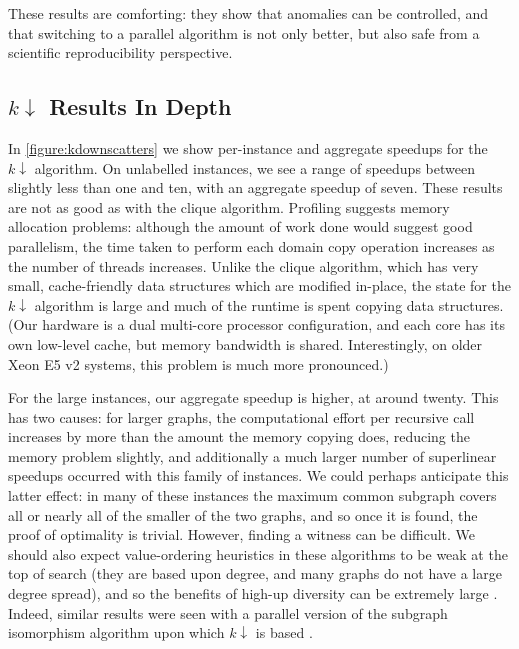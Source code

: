\documentclass{llncs}
\begin{document}
These results are comforting: they show that anomalies can be controlled, and that
switching to a parallel algorithm is not only better, but also safe from a scientific
reproducibility perspective.

\subsection{$k{\downarrow}$ Results In Depth}

In \cref{figure:kdownscatters} we show per-instance and aggregate speedups for the $k{\downarrow}$
algorithm. On unlabelled instances, we see a range of speedups between slightly less than one and
ten, with an aggregate speedup of seven. These results are not as good as with the clique algorithm.
Profiling suggests memory allocation problems: although the amount of work done would suggest good
parallelism, the time taken to perform each domain copy operation increases as the number of threads
increases. Unlike the clique algorithm, which has very small, cache-friendly data structures which
are modified in-place, the state for the $k{\downarrow}$ algorithm is large and much of the runtime
is spent copying data structures. (Our hardware is a dual multi-core processor configuration, and
each core has its own low-level cache, but memory bandwidth is shared. Interestingly, on older Xeon
E5 v2 systems, this problem is much more pronounced.)

For the large instances, our aggregate speedup is higher, at around twenty. This has two causes: for
larger graphs, the computational effort per recursive call increases by more than the amount the
memory copying does, reducing the memory problem slightly, and additionally a much larger
number of superlinear speedups occurred with this family of instances. We could perhaps anticipate
this latter effect: in many of these instances the maximum common subgraph covers all or nearly all
of the smaller of the two graphs, and so once it is found, the proof of optimality is trivial.
However, finding a witness can be difficult. We should also expect value-ordering heuristics in
these algorithms to be weak at the top of search (they are based upon degree, and many graphs do not
have a large degree spread), and so the benefits of high-up diversity can be extremely large
\cite{DBLP:conf/ijcai/HarveyG95,DBLP:conf/cp/ChuSS09,DBLP:journals/topc/McCreeshP15}. Indeed,
similar results were seen with a parallel version of the subgraph isomorphism algorithm upon which
$k{\downarrow}$ is based \cite{DBLP:conf/cp/McCreeshP15}.
\end{document}
